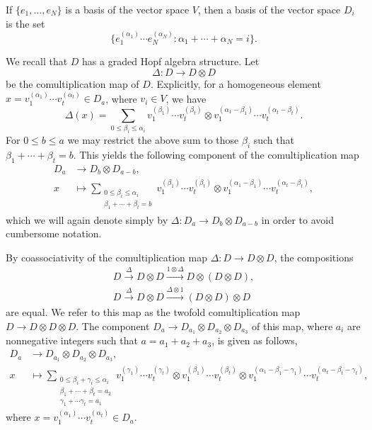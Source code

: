 \documentclass[11pt]{amsart}
\theoremstyle{definition}
\numberwithin{equation}{section}
\begin{document}
If $\{e_1, \dots, e_N\}$ is a basis of the vector space $V$, then a basis of the vector space $D_i$ is the set \[\{e_1^{(\alpha_1)}\cdots e_N^{(\alpha_N)}: \alpha_1+\cdots + \alpha_N = i\}.\]

We recall that $D$ has a graded Hopf algebra structure. Let \[\Delta : D \to D \otimes D\] be the comultiplication map of $D$. Explicitly, for a homogeneous element $x= v_1^{(\alpha_1)}\cdots v_t^{(\alpha_t)} \in D_a$, where $v_i \in V$, we have \[ \Delta(x)=\sum_{0\le \beta_i \le \alpha_i} v_1^{(\beta_1)}\cdots v_t^{(\beta_t)} \otimes v_1^{(\alpha_1 - \beta_1)}\cdots v_t^{(\alpha_t - \beta_t)}.\]
For $0 \le b \le a$ we may restrict the above sum to those $\beta_i$ such that $\beta_1 + \cdots +  \beta_t= b$. This yields the following component of the comultiplication map \begin{align*} D_a &\to D_b \otimes D_{a-b}, \\  x &\mapsto \sum_{\substack{0\le \beta_i \le \alpha_i \\ \beta_1+\cdots+\beta_t=b}} v_1^{(\beta_1)}\cdots v_t^{(\beta_t)} \otimes v_1^{(\alpha_1 - \beta_1)}\cdots v_t^{(\alpha_t - \beta_t)}, \end{align*}
which we will again denote simply by $\Delta:  D_a \to D_b \otimes D_{a-b}$ in order to avoid cumbersome notation.

By coassociativity of the comultiplication map  $\Delta : D \to D \otimes D$, the compositions \begin{align*}D \xrightarrow{\Delta} D \otimes D \xrightarrow{1\otimes \Delta}D \otimes (D \otimes D),\\
D \xrightarrow{\Delta} D \otimes D \xrightarrow{\Delta \otimes 1}(D \otimes D) \otimes D	
 \end{align*}are equal. We refer to this map as the twofold comultiplication map $D \to D \otimes D \otimes D$. The component $D_a \to D_{a_1} \otimes D_{a_2} \otimes D_{a_3}$ of this map, where $a_i$ are nonnegative integers such that $a=a_1+a_2+a_3$, is given as follows,
\begin{align*} D_a &\to D_{a_1} \otimes D_{a_2} \otimes D_{a_3}, \\  x &\mapsto \sum_{\substack{0\le \beta_i + \gamma_i \le \alpha_i \\ \beta_1+\cdots+\beta_t=a_2\\\gamma_1 + \cdots \gamma_t = a_1}} v_1^{(\gamma_1)}\cdots v_t^{(\gamma_t)} \otimes v_1^{(\beta_1)}\cdots v_t^{(\beta_t)} \otimes v_1^{(\alpha_1 - \beta_1 - \gamma_1)}\cdots v_t^{(\alpha_t - \beta_t - \gamma_t)}, \end{align*}
where $x= v_1^{(\alpha_1)}\cdots v_t^{(\alpha_t)} \in D_a$.
\end{document}
